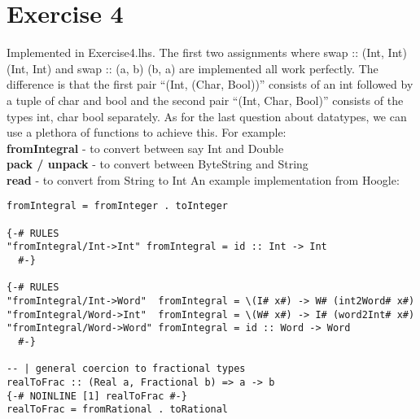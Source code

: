 \documentclass{article}
\begin{document}
\section*{Exercise 4}
Implemented in Exercise4.lhs.
The first two assignments where swap :: (Int, Int) (Int, Int) and swap :: (a, b)  (b, a) are implemented all work perfectly.
\newline
\newline
The difference is that the first pair ``(Int, (Char, Bool))'' consists of an int followed by a tuple of char and bool and the second pair ``(Int, Char, Bool)'' consists of the types int, char bool separately.
As for  the last question about datatypes, we can use a plethora of functions to achieve this. For example: \\
\textbf{fromIntegral} - to convert between say Int and Double\\
\textbf{pack / unpack} - to convert between ByteString and String\\
\textbf{read} - to convert from String to Int
\newline
An example implementation from Hoogle:
\begin{lstlisting}
fromIntegral = fromInteger . toInteger

{-# RULES
"fromIntegral/Int->Int" fromIntegral = id :: Int -> Int
  #-}

{-# RULES
"fromIntegral/Int->Word"  fromIntegral = \(I# x#) -> W# (int2Word# x#)
"fromIntegral/Word->Int"  fromIntegral = \(W# x#) -> I# (word2Int# x#)
"fromIntegral/Word->Word" fromIntegral = id :: Word -> Word
  #-}

-- | general coercion to fractional types
realToFrac :: (Real a, Fractional b) => a -> b
{-# NOINLINE [1] realToFrac #-}
realToFrac = fromRational . toRational
\end{lstlisting}
\end{document}
